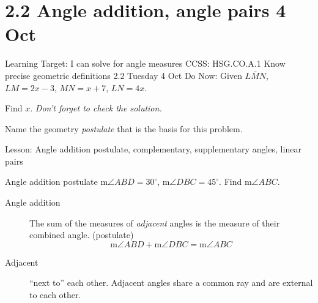 \section{2.2 Angle addition, angle pairs \hfill 4 Oct}
\begin{frame}{Learning Target: I can solve for angle measures}
  {CCSS: HSG.CO.A.1 Know precise geometric definitions \hfill \alert{2.2 Tuesday 4 Oct}}
    Do Now: Given $\overline{LMN}$, $LM=2x-3$, $MN=x+7$, $LN=4x$. \par  
    Find $x$. \hfill \emph{Don't forget to check the solution.} \medskip 
      \begin{flushleft}
      \end{flushleft}
      \vspace{2cm}
    Name the geometry \emph{postulate} that is the basis for this problem. \par \medskip 
    Lesson: Angle addition postulate, complementary, supplementary angles, linear pairs
  \end{frame}

\begin{frame}{Angle addition postulate}
  m$\angle ABD=30^\circ$, m$\angle DBC=45^\circ$. Find m$\angle ABC$. \par \bigskip
     \bigskip
    \begin{description}
      \item[Angle addition] The sum of the measures of \emph{adjacent} angles is the measure of their combined angle. (postulate)
      $$\text{m}\angle ABD + \text{m}\angle DBC = \text{m}\angle ABC$$
      \item[Adjacent] ``next to'' each other. Adjacent angles share a common ray and are external to each other.
    \end{description}
  \end{frame}

